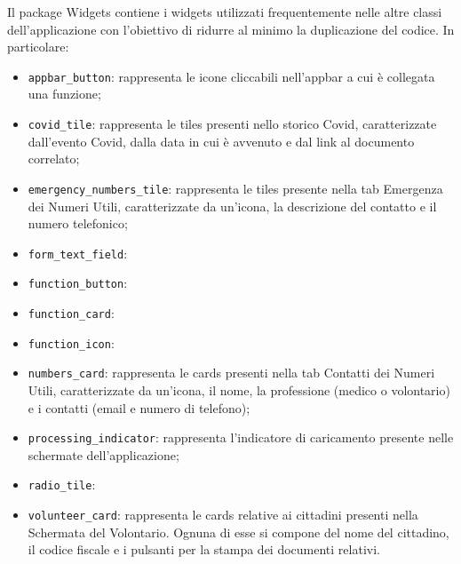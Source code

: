 \documentclass[12pt,a4paper,twoside,openright,titlepage]{book}
\begin{document}
Il package Widgets contiene i widgets utilizzati frequentemente nelle altre classi dell'applicazione con l'obiettivo di ridurre al minimo la duplicazione del codice. In particolare:
\begin{itemize}
\item \texttt{appbar\_button}: rappresenta le icone cliccabili nell'appbar a cui è collegata una funzione;
\item \texttt{covid\_tile}: rappresenta le tiles presenti nello storico Covid, caratterizzate dall'evento Covid, dalla data in cui è avvenuto e dal link al documento correlato;
\item \texttt{emergency\_numbers\_tile}: rappresenta le tiles presente nella tab Emergenza dei Numeri Utili, caratterizzate da un'icona, la descrizione del contatto e il numero telefonico;
\item \texttt{form\_text\_field}:
\item \texttt{function\_button}:
\item \texttt{function\_card}:
\item \texttt{function\_icon}:
\item \texttt{numbers\_card}: rappresenta le cards presenti nella tab Contatti dei Numeri Utili, caratterizzate da un'icona, il nome, la professione (medico o volontario) e i contatti (email e numero di telefono);
\item \texttt{processing\_indicator}: rappresenta l'indicatore di caricamento presente nelle schermate dell'applicazione;
\item \texttt{radio\_tile}:
\item \texttt{volunteer\_card}: rappresenta le cards relative ai cittadini presenti nella Schermata del Volontario. Ognuna di esse si compone del nome del cittadino, il codice fiscale e i pulsanti per la stampa dei documenti relativi.
\end{itemize}
\end{document}
